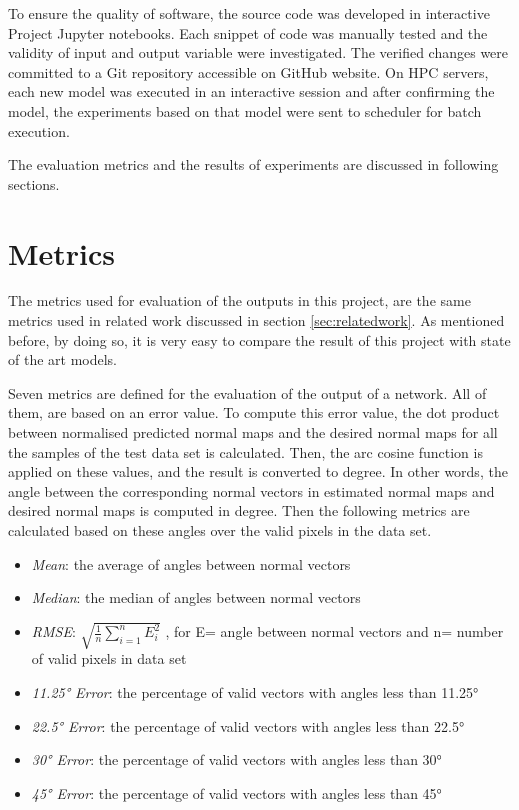 To ensure the quality of software, the source code was developed in interactive Project Jupyter notebooks. Each snippet of code was manually tested and the validity of input and output variable were investigated. The verified changes were committed to a Git repository accessible on GitHub website. On HPC servers, each new model was executed in an interactive session and after confirming the model, the experiments based on that model were sent to scheduler for batch execution. 

The evaluation metrics and the results of experiments are discussed in following sections.

\pagebreak

\section{Metrics}

The metrics used for evaluation of the outputs in this project, are the same metrics used in related work discussed in section \ref{sec:relatedwork}. As mentioned before, by doing so, it is very easy to compare the result of this project with state of the art models. 

Seven metrics are defined for the evaluation of the output of a network. All of them, are based on an error value. To compute this error value, the dot product between normalised predicted normal maps and the desired normal maps for all the samples of the test data set is calculated. Then, the arc cosine function is applied on these values, and the result is converted to degree. In other words, the angle between the corresponding normal vectors in estimated normal maps and desired normal maps is computed in degree. Then the following metrics are calculated based on these angles over the valid pixels in the data set. 

\begin{itemize}
    \item \emph{Mean}: the average of angles between normal vectors
    \item \emph{Median}: the median of angles between normal vectors
    \item \emph{RMSE}: $\sqrt{\frac{1}{n}\sum_{i=1}^{n}E_{i}^{2}}$ , for E= angle between normal vectors and n= number of valid pixels in data set
    \item \emph{\ang{11.25} Error}: the percentage of valid vectors with angles less than \ang{11.25}
    \item \emph{\ang{22.5} Error}: the percentage of valid vectors with angles less than \ang{22.5}
    \item \emph{\ang{30} Error}: the percentage of valid vectors with angles less than \ang{30}
    \item \emph{\ang{45} Error}: the percentage of valid vectors with angles less than \ang{45}
\end{itemize}

